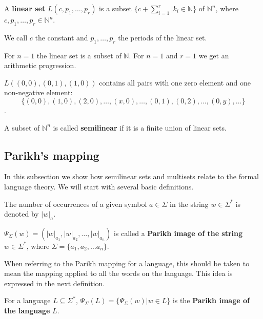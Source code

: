 \begin{definition}
  A {\bf linear set} $L(c,p_1,\ldots,p_r)$ is a subset $\{c+\sum\limits_{i=1}^r|k_i\in\mathbb N\}$ of $\mathbb N^n$, where $c,p_1,\ldots,p_r\in \mathbb N^n$.
\end{definition}

We call $c$ the constant and $p_1,\ldots,p_r$ the periods of the linear set.

\begin{example}
  For $n=1$ the linear set is a subset of $\mathbb N$. For $n=1$ and $r=1$ we get an arithmetic progression.
\end{example}

\begin{example}
  $L((0,0),(0,1),(1,0))$ contains all pairs with one zero element and one non-negative element: $$\{(0,0), (1,0), (2,0), \ldots, (x,0), \ldots, (0,1), (0,2), \ldots, (0,y), \ldots\}$$.
\end{example}

\begin{definition}
  A subset of $\mathbb N^n$ is called {\bf semilinear} if it is a finite union of linear sets.
\end{definition}

\subsection{Parikh's mapping} %
\label{sec:parikh_s_mapping}

In this subsection we show how semilinear sets and multisets relate to the formal language theory. We will start with several basic definitions.

The number of occurrences of a given symbol $a\in \Sigma$ in the string $w\in \Sigma^*$ is denoted by $|w|_a$.

\begin{definition}
$\Psi_\Sigma(w)=(|w|_{a_1},|w|_{a_2},\ldots,|w|_{a_n})$ is called a {\bf Parikh image of the string} $w\in \Sigma^*$, where $\Sigma=\{a_1,a_2,\ldots a_n\}$.
\end{definition}

When referring to the Parikh mapping for a language, this should be taken to mean the mapping applied to all the words on the language. This idea is expressed in the next definition. 

\begin{definition}
For a language $L\subseteq \Sigma^*$, $\Psi_\Sigma(L)=\{\Psi_\Sigma(w)|w\in L\}$ is the {\bf Parikh image of the language} $L$.
\end{definition}


